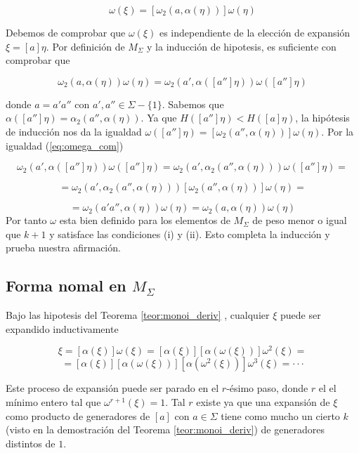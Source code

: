 \documentclass[12pt]{article}
\theoremstyle{definition}
\begin{document}
$$\omega(\xi)=[\omega_2(a,\alpha(\eta))]\omega(\eta)$$

Debemos de comprobar que $\omega(\xi)$ es independiente de la elección de expansión $\xi=[a]\eta$. Por definición de $M_\Sigma$ y la inducción de hipotesis, es suficiente con comprobar que

$$\omega_2(a,\alpha(\eta))\omega(\eta)=\omega_2(a',\alpha([a'']\eta))\omega([a'']\eta)$$

donde $a=a'a''$ con $a',a''\in\Sigma-\{1\}$. Sabemos que $\alpha([a'']\eta)=\alpha_2(a'',\alpha(\eta))$. Ya que $H([a'']\eta) < H([a]\eta)$, la hipótesis de inducción nos da la igualdad $\omega([a'']\eta)=[\omega_2(a'',\alpha(\eta))]\omega(\eta)$. Por la igualdad (\ref{eq:omega_com})


$$\omega_2(a',\alpha([a'']\eta))\omega([a'']\eta)=\omega_2(a',\alpha_2(a'',\alpha(\eta)))\omega([a'']\eta)=$$

$$= \omega_2(a',\alpha_2(a'',\alpha(\eta)))[\omega_2(a'',\alpha(\eta))]\omega(\eta)=$$

$$ =\omega_2(a'a'',\alpha(\eta))\omega(\eta)=  \omega_2(a,\alpha(\eta))\omega(\eta)$$
\newline
\newline
Por tanto $\omega$ esta bien definido para los elementos de $M_\Sigma$ de peso menor o igual que $k+1$ y satisface las condiciones (i) y (ii). Esto completa la inducción y prueba nuestra afirmación.







\subsection{Forma nomal en $M_\Sigma$}

Bajo las hipotesis del Teorema \ref{teor:monoi_deriv} , cualquier $\xi$ puede ser expandido inductivamente

$$\xi=[\alpha(\xi)]\omega(\xi)=[\alpha(\xi)][\alpha(\omega(\xi))]\omega^2(\xi)=$$
$$=[\alpha(\xi)][\alpha(\omega(\xi))][\alpha(\omega^2(\xi))]\omega^3(\xi)=\cdot\cdot\cdot$$

Este proceso de expansión puede ser parado en el $r$-ésimo paso, donde $r$ el el mínimo entero tal que $\omega^{r+1}(\xi)=1$. Tal $r$ existe ya que una expansión de $\xi$ como producto de  generadores de $[a]$ con $a\in\Sigma$ tiene como mucho un cierto $k$ (visto en la demostración del Teorema \ref{teor:monoi_deriv}) de generadores distintos de $1$.
\newline\newline
\end{document}
